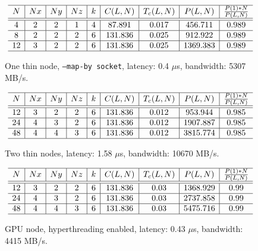 \documentclass{article}
\begin{document}
\begin{figure}[h!]
    $$
        \begin{array}{c | c | c | c | c | c | c | c | c} \hline
            N  & Nx & Ny & Nz & k & C(L,N)  & T_c(L,N) &     P(L,N)     & \frac{P(1)*N}{P(L,N)} \\ \hline
            \hline
            4  & 2  & 2  & 1  & 4 & 87.891  &  0.017   & 456.711  &         0.989         \\ \hline
            8  & 2  & 2  & 2  & 6 & 131.836 &  0.025   & 912.922  &         0.989         \\ \hline
            12 & 3  & 2  & 2  & 6 & 131.836 &  0.025   & 1369.383 &         0.989         \\ \hline
        \end{array}
    $$
    \caption{One thin node, \texttt{--map-by socket}, latency: 0.4 $\mu$s, bandwidth: 5307 MB/s.}
\end{figure}


\begin{figure}[h!]
    $$
        \begin{array}{c | c | c | c | c | c | c | c | c} \hline
            N  & Nx & Ny & Nz & k & C(L,N)  & T_c(L,N) &     P(L,N)     & \frac{P(1)*N}{P(L,N)} \\ \hline
            \hline
            12 & 3  & 2  & 2  & 6 & 131.836 &  0.012   & 953.944  &         0.985         \\ \hline
            24 & 4  & 3  & 2  & 6 & 131.836 &  0.012   & 1907.887 &         0.985         \\ \hline
            48 & 4  & 4  & 3  & 6 & 131.836 &  0.012   & 3815.774 &         0.985         \\ \hline
        \end{array}
    $$
    \caption{Two thin nodes, latency: 1.58 $\mu$s, bandwidth: 10670 MB/s.}
\end{figure}


\begin{figure}[h!]
    $$
        \begin{array}{c | c | c | c | c | c | c | c | c} \hline
            N  & Nx & Ny & Nz & k & C(L,N)  & T_c(L,N) &     P(L,N)     & \frac{P(1)*N}{P(L,N)} \\ \hline
            \hline
            12 & 3  & 2  & 2  & 6 & 131.836 &   0.03   & 1368.929 &         0.99          \\ \hline
            24 & 4  & 3  & 2  & 6 & 131.836 &   0.03   & 2737.858 &         0.99          \\ \hline
            48 & 4  & 4  & 3  & 6 & 131.836 &   0.03   & 5475.716 &         0.99          \\ \hline
        \end{array}
    $$
    \caption{GPU node, hyperthreading enabled, latency: 0.43 $\mu$s, bandwidth: 4415 MB/s.}
\end{figure}
\end{document}
